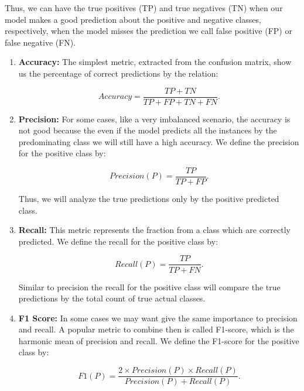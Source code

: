 	Thus, we can have the true positives (TP) and true negatives (TN) when our model makes a good prediction about the positive and negative classes, respectively, when the model misses the prediction we call false positive (FP) or false negative (FN). 
	
	\begin{enumerate}
		\item \textbf{Accuracy:} The simplest metric, extracted from the confusion matrix, show us the percentage of correct predictions by the relation:
		
		\begin{equation}
			Accuracy = \frac{TP + TN}{TP + FP + TN + FN} \text{.}
		\end{equation}
		
		\item \textbf{Precision:} For some cases, like a very imbalanced scenario, the accuracy is not good because the even if the model predicts all the instances by the predominating class we will still have a high accuracy. We define the precision for the positive class by:
		
		\begin{equation}
			Precision(P) = \frac{TP}{TP + FP} \text{.}
		\end{equation}
	
		Thus, we will analyze the true predictions only by the positive predicted class.
		
		\item \textbf{Recall:} This metric represents the fraction from a class which are correctly predicted. We define the recall for the positive class by:
		
		\begin{equation}
			Recall(P) = \frac{TP}{TP + FN} \text{.}
		\end{equation}
		
		Similar to precision the recall for the positive class will compare the true predictions by the total count of true actual classes.
		
		\item \textbf{F1 Score:} In some cases we may want give the same importance to precision and recall. A popular metric to combine then is called F1-score, which is the harmonic mean of precision and recall. We define the F1-score for the positive class by:
		
		\begin{equation}
			F1(P) = \frac{2 \times Precision(P) \times Recall(P)}{Precision(P) + Recall(P)} \text{.}
		\end{equation}
	
	\end{enumerate}
	
	